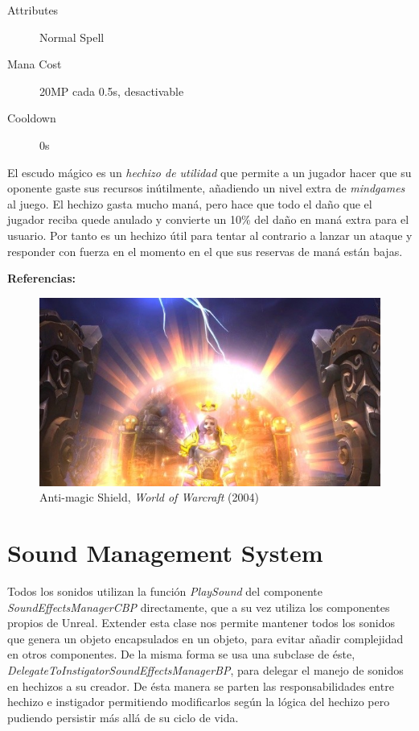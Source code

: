 \documentclass[12pt]{report}
\begin{document}
\begin{description}
	\item[Attributes] Normal Spell
	\item[Mana Cost] 20MP cada 0.5s, desactivable
	\item[Cooldown] 0s
\end{description}

El escudo mágico es un \textit{hechizo de utilidad} que permite a un jugador hacer que su oponente gaste sus recursos inútilmente, añadiendo un nivel extra de \textit{mindgames} al juego. El hechizo gasta mucho maná, pero hace que todo el daño que el jugador reciba quede anulado y convierte un 10\% del daño en maná extra para el usuario. Por tanto es un hechizo útil para tentar al contrario a lanzar un ataque y responder con fuerza en el momento en el que sus reservas de maná están bajas.

\textbf{Referencias:}

\begin{figure}[H]
    \centering
    \includegraphics[width=1\textwidth]{anti_magic_shield_wow}
	\captionsetup{labelformat=empty}
    \caption{Anti-magic Shield, \textit{World of Warcraft} (2004)}
\end{figure}

\section{Sound Management System}

Todos los sonidos utilizan la función \textit{PlaySound} del componente \textit{\emph{SoundEffectsManagerCBP}} directamente, que a su vez utiliza los componentes propios de Unreal. Extender esta clase nos permite mantener todos los sonidos que genera un objeto encapsulados en un objeto, para evitar añadir complejidad en otros componentes. De la misma forma se usa una subclase de éste, \textit{\emph{DelegateToInstigatorSoundEffectsManagerBP}}, para delegar el manejo de sonidos en hechizos a su creador. De ésta manera se parten las responsabilidades entre hechizo e instigador permitiendo modificarlos según la lógica del hechizo pero pudiendo persistir más allá de su ciclo de vida.
\end{document}
